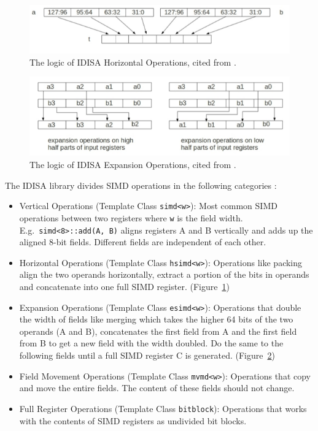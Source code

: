\begin{figure}[ht!]
\centering
\includegraphics[width=130mm]{draw/horizontal.png}
\caption[Horizontal Operations in IDISA]{The logic of IDISA Horizontal Operations, cited from \cite{hua_idisa}.}
\label{figure:horizontal}
\end{figure}

\begin{figure}[ht!]
\centering
\includegraphics[width=130mm]{draw/expansion.png}
\caption[Expansion Operations in IDISA]{The logic of IDISA Expansion Operations, cited from \cite{hua_idisa}.}
\label{figure:expansion}
\end{figure}

The IDISA library divides SIMD operations in the following categories \cite{idisa_webpage}:
\begin{itemize}
    \item Vertical Operations (Template Class {\tt simd<w>}): Most common SIMD operations between two registers where {\tt w} is the field width. E.g.\ {\tt simd<8>::add(A, B)} aligns registers A and B vertically and adds up the aligned 8-bit fields. Different fields are independent of each other.
    \item Horizontal Operations (Template Class {\tt hsimd<w>}): Operations like packing align the two operands horizontally, extract a portion of the bits in operands and concatenate into one full SIMD register. (Figure~\ref{figure:horizontal})
    \item Expansion Operations (Template Class {\tt esimd<w>}): Operations that double the width of fields like merging which takes the higher 64 bits of the two operands (A and B), concatenates the first field from A and the first field from B to get a new field with the width doubled. Do the same to the following fields until a full SIMD register C is generated. (Figure~\ref{figure:expansion})
    \item Field Movement Operations (Template Class {\tt mvmd<w>}): Operations that copy and move the entire fields. The content of these fields should not change.
    \item Full Register Operations (Template Class {\tt bitblock}): Operations that works with the contents of SIMD registers as undivided bit blocks.
\end{itemize}

